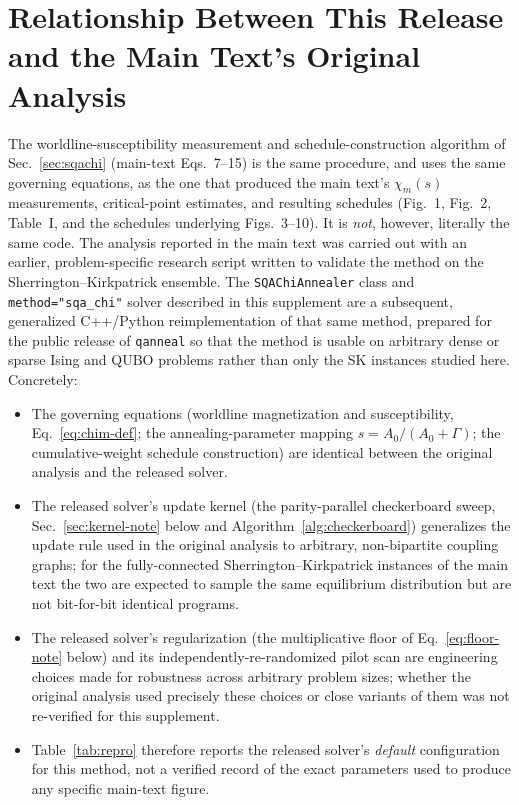 \documentclass[11pt]{article}
\newcommand{\chim}{\chi_{m}}
\begin{document}
\section{Relationship Between This Release and the Main Text's Original Analysis}
\label{sec:relation}

The worldline-susceptibility measurement and schedule-construction algorithm of
Sec.~\ref{sec:sqachi} (main-text Eqs.~7--15) is the same procedure, and uses the same governing
equations, as the one that produced the main text's $\chim(s)$ measurements, critical-point
estimates, and resulting schedules (Fig.~1, Fig.~2, Table~I, and the schedules underlying
Figs.~3--10). It is \emph{not}, however, literally the same code. The analysis reported in the
main text was carried out with an earlier, problem-specific research script written to validate
the method on the Sherrington--Kirkpatrick ensemble. The \texttt{SQAChiAnnealer} class and
\texttt{method="sqa\_chi"} solver described in this supplement are a subsequent, generalized
C++/Python reimplementation of that same method, prepared for the public release of
\texttt{qanneal} so that the method is usable on arbitrary dense or sparse Ising and QUBO problems
rather than only the SK instances studied here. Concretely:

\begin{itemize}
\item The governing equations (worldline magnetization and susceptibility, Eq.~\eqref{eq:chim-def};
the annealing-parameter mapping $s=A_0/(A_0+\Gamma)$; the cumulative-weight schedule construction)
are identical between the original analysis and the released solver.
\item The released solver's update kernel (the parity-parallel checkerboard sweep,
Sec.~\ref{sec:kernel-note} below and Algorithm~\ref{alg:checkerboard}) generalizes the update rule
used in the original analysis to arbitrary, non-bipartite coupling graphs; for the fully-connected
Sherrington--Kirkpatrick instances of the main text the two are expected to sample the same
equilibrium distribution but are not bit-for-bit identical programs.
\item The released solver's regularization (the multiplicative floor of Eq.~\eqref{eq:floor-note}
below) and its independently-re-randomized pilot scan are engineering choices made for robustness
across arbitrary problem sizes; whether the original analysis used precisely these choices or
close variants of them was not re-verified for this supplement.
\item Table~\ref{tab:repro} therefore reports the released solver's \emph{default} configuration
for this method, not a verified record of the exact parameters used to produce any specific
main-text figure.
\end{itemize}
\end{document}
